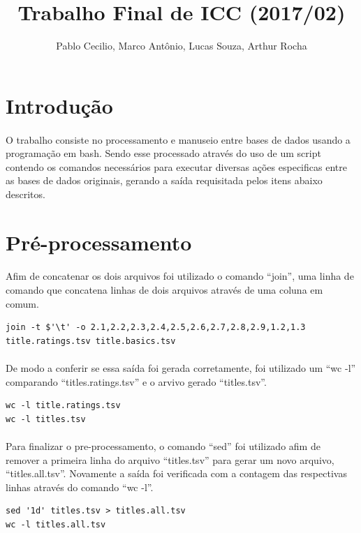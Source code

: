 \documentclass[12pt]{article}
\title{Trabalho Final de ICC (2017/02)}
\author{Pablo Cecilio, Marco Antônio, Lucas Souza, Arthur Rocha}
\date{}
\begin{document}
 
\maketitle

\section{Introdução}

\paragraph{}
O trabalho consiste no processamento e manuseio entre bases de dados usando a programação em bash. Sendo esse processado através do uso de um script contendo os comandos necessários para executar diversas ações especificas entre as bases de dados originais, gerando a saída requisitada pelos itens abaixo descritos.

\section{Pré-processamento}

\paragraph{}
Afim de concatenar os dois arquivos foi utilizado o comando ``join'', uma linha de comando que concatena linhas de dois arquivos através de uma coluna em comum.
\begin{verbatim}
join -t $'\t' -o 2.1,2.2,2.3,2.4,2.5,2.6,2.7,2.8,2.9,1.2,1.3 title.ratings.tsv title.basics.tsv
\end{verbatim}

\paragraph{}
De modo a conferir se essa saída foi gerada corretamente, foi utilizado um ``wc -l'' comparando ``titles.ratings.tsv'' e o arvivo gerado ``titles.tsv''.
\begin{verbatim}
wc -l title.ratings.tsv
wc -l titles.tsv
\end{verbatim}

\paragraph{}
Para finalizar o pre-processamento, o comando ``sed'' foi utilizado afim de remover a primeira linha do arquivo ``titles.tsv'' para gerar um novo arquivo, ``titles.all.tsv''. Novamente a saída foi verificada com a contagem das respectivas linhas através do comando ``wc -l''.
\begin{verbatim}
sed '1d' titles.tsv > titles.all.tsv
wc -l titles.all.tsv
\end{verbatim}
\end{document}
